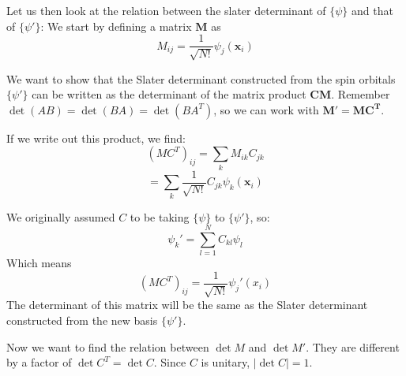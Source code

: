 \documentclass[a4paper,10pt, twocolumn, pre]{revtex4}
\newcommand{\xvec}{\mathbf{x}}
\newcommand{\mb}{\mathbf}
\begin{document}
\begin{appendix}
Let us then look at the relation between the slater determinant of $\{ \psi\}$ and that of $\{\psi'\}$:
We start by defining a matrix $\mb{M}$ as
\begin{equation}
	M_{ij} =\frac{1}{\sqrt{N!}} \psi_j(\xvec_i)
\end{equation}

We want to show that the Slater determinant constructed from the spin orbitals $\{\psi'\}$ can be written as the determinant of the matrix product $\mb{C}\mb{M}$. Remember $\det(AB) = \det(BA) = \det(BA^T)$, so we can work with $\mb{M}'=\mb{M}\mb{C^T}$.

If we write out this product, we find:
\begin{equation}
	(MC^T)_{ij} = \sum_{k} M_{ik} C_{jk}
\end{equation}
\begin{equation}
	= \sum_{k}\frac{1}{\sqrt{N!}}C_{jk}\psi_k(\xvec_i)
\end{equation}

We originally assumed $C$ to be taking $\{ \psi\}$ to $\{\psi'\}$, so:
\begin{equation}
	\psi_k' = \sum_{l=1}^N C_{kl} \psi_l
	\label{eq:basis_change}
\end{equation}
Which means
\begin{equation}
(MC^T)_{ij} = \frac{1}{\sqrt{N!}} \psi_j'(x_i)
\end{equation}
The determinant of this matrix will be the same as the Slater determinant constructed from the new basis $\{\psi'\}$.

Now we want to find the relation between $\det{M}$ and $\det{M'}$. They are different by a factor of $\det{C^T} = \det{C}$. Since $C$ is unitary, $|\det C| = 1$.
\end{appendix}
\end{document}
